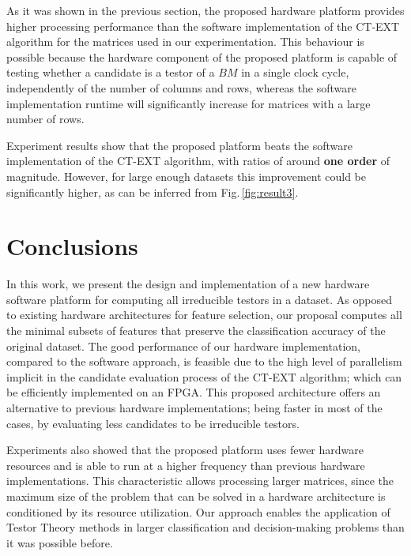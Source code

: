 \documentclass[authoryear,preprint,review,12pt]{elsarticle}
\begin{document}

As it was shown in the previous section, the proposed hardware platform provides higher processing
performance than the software implementation of the CT-EXT
algorithm for the matrices used in our experimentation. 
This behaviour is possible because the hardware
component of the proposed platform is capable of testing whether a 
candidate is a testor of a $BM$ in a single clock cycle,
independently of the number of columns and rows, whereas
the software implementation runtime will significantly
increase for matrices with a large number of rows.

Experiment results show that the proposed platform beats the software implementation of
the CT-EXT algorithm, with ratios of around \textbf{one order} of magnitude. However, for large 
enough datasets this improvement could be significantly higher, as can be inferred from 
Fig.\,\ref{fig:result3}.

\section{Conclusions}
\label{sect:8}
In this work, we present the design and implementation of a new hardware software platform for
computing all irreducible testors in a dataset.  As opposed to existing hardware 
architectures for feature selection, our proposal computes all the
minimal subsets of features that preserve the classification accuracy of the original dataset.
The good performance of our hardware implementation, compared to the software approach, is 
feasible due to the high level of parallelism implicit in the candidate evaluation process of 
the CT-EXT algorithm; which can be efficiently implemented on an FPGA. 
This proposed architecture offers an alternative to previous hardware implementations; being 
faster in most of the cases, by evaluating less candidates to be irreducible testors. 

Experiments also showed that the proposed platform uses fewer hardware resources and is able to 
run at a higher frequency than previous hardware implementations. This characteristic allows 
processing larger matrices, since the maximum size of the problem that can be solved in a hardware 
architecture is conditioned by its resource utilization. 
Our approach enables the application of Testor Theory methods in larger classification and 
decision-making problems than it was possible before.
\end{document}
